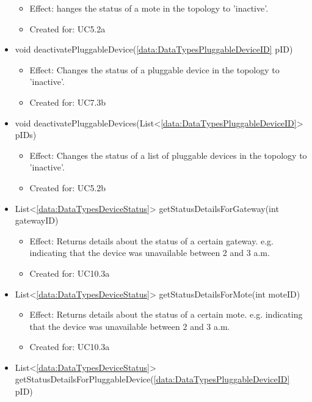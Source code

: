 \begin{description}
\begin{itemize}[noitemsep,nolistsep,leftmargin=-.25cm]
        \begin{itemize}[noitemsep,nolistsep]
           \item Effect: hanges the status of a mote in the topology to 'inactive'.
\item Created for: UC5.2a
        \end{itemize}
      \item \textsf{void deactivatePluggableDevice(\ref{data:DataTypesPluggableDeviceID} pID)}
        \begin{itemize}[noitemsep,nolistsep]
           \item Effect: Changes the status of a pluggable device in the topology to 'inactive'.
\item Created for: UC7.3b
        \end{itemize}
      \item \textsf{void deactivatePluggableDevices(List\textless{}\ref{data:DataTypesPluggableDeviceID}\textgreater{} pIDs)}
        \begin{itemize}[noitemsep,nolistsep]
           \item Effect: Changes the status of a list of pluggable devices in the topology to 'inactive'.
\item Created for: UC5.2b
        \end{itemize}
      \item \textsf{List\textless{}\ref{data:DataTypesDeviceStatus}\textgreater{} getStatusDetailsForGateway(int gatewayID)}
        \begin{itemize}[noitemsep,nolistsep]
           \item Effect: Returns details about the status of a certain gateway. e.g. indicating that the device was unavailable between 2 and 3 a.m.
\item Created for: UC10.3a
        \end{itemize}
      \item \textsf{List\textless{}\ref{data:DataTypesDeviceStatus}\textgreater{} getStatusDetailsForMote(int moteID)}
        \begin{itemize}[noitemsep,nolistsep]
           \item Effect: Returns details about the status of a certain mote. e.g. indicating that the device was unavailable between 2 and 3 a.m.
\item Created for: UC10.3a
        \end{itemize}
      \item \textsf{List\textless{}\ref{data:DataTypesDeviceStatus}\textgreater{} getStatusDetailsForPluggableDevice(\ref{data:DataTypesPluggableDeviceID} pID)}

\end{itemize}
\end{description}
